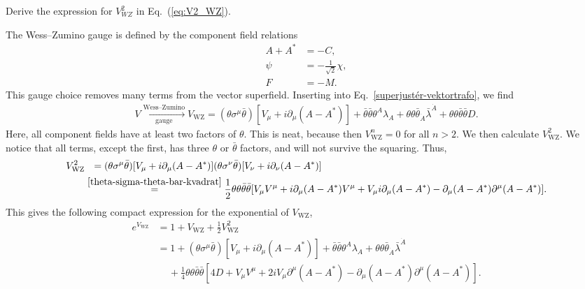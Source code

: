 \documentclass[notes.tex]{subfiles}
\begin{document}
\begin{Exercise}
Derive the expression for $V_{WZ}^2$ in Eq.~(\ref{eq:V2_WZ}).
\end{Exercise}

\begin{Answer}
The Wess--Zumino gauge is  defined by the component field relations
\begin{align*}
    A + A^* &= -C, \\
    \psi & = -\frac{1}{\sqrt{2}}\chi, \\
    F &= -M.
\end{align*}
This gauge choice removes many terms from the vector superfield. Inserting into Eq.~\eqref{superjustér-vektortrafo}, we find
\begin{align}
    V \xrightarrow[\text{gauge}]{\text{Wess--Zumino}} V_{\text{WZ}} = (\theta \sigma^\mu \bar{\theta})\left[V_\mu + i\partial_\mu(A - A^*)\right] + \bar{\theta}\bar{\theta}\theta^{A}\lambda_A + \theta \theta \bar{\theta}_{\dot{A}}\bar{\lambda}^{\dot{A}} + \theta \theta \bar{\theta}\bar{\theta}D.
\end{align}
Here, all component fields have at least two factors of $\theta$. This is neat, because then $V_{\text{WZ}}^n = 0$ for all $n > 2$. We then calculate $V^2_{\text{WZ}}$. We notice that all terms, except the first, has three $\theta$ or $\bar{\theta}$ factors, and will not survive the squaring. Thus,
\begin{align*}
    V_{\text{WZ}}^2 &\, \,\,\,= (\theta\sigma^\mu\bar{\theta})[V_\mu + i\partial_\mu (A - A^*)](\theta\sigma^\nu \bar{\theta})[V_\nu + i\partial_\nu (A - A^*)] \\
    &\overset{\eqref{theta-sigma-theta-bar-kvadrat}}{=} \frac{1}{2}\theta \theta \bar{\theta}\bar{\theta}[V_\mu V^\mu + i\partial_\mu(A - A^*)V^\mu + V_\mu i \partial_\mu(A - A^*)-\partial_\mu(A - A^*)\partial^\mu(A - A^*)].
\end{align*}
This gives the following compact expression for the exponential of $V_{\text{WZ}}$,
\begin{align}
    e^{V_{\text{WZ}}} &= 1 + V_{\text{WZ}} + \frac{1}{2}V_{\text{WZ}}^2 \nonumber \\
    &= 1 + (\theta \sigma^\mu \bar{\theta})\left[V_\mu + i\partial_\mu(A - A^*)\right] + \bar{\theta}\bar{\theta}\theta^{A}\lambda_A + \theta \theta \bar{\theta}_{\dot{A}}\bar{\lambda}^{\dot{A}} \nonumber \\
    & \quad \,+ \frac{1}{4}\theta \theta \bar{\theta}\bar{\theta}\left[4D + V_\mu V^{\mu} + 2iV_\mu\partial^{\mu}(A - A^*) - \partial_\mu(A - A^*)\partial^{\mu}(A - A^*) \right].
    \label{Eksponensial, Wess-Zumino}
\end{align}
\end{Answer}
\end{document}
